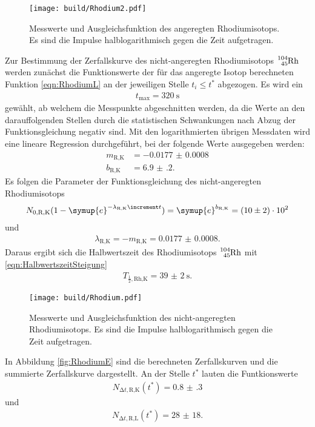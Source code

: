 \begin{figure}
  \centering
  \texttt{[image: build/Rhodium2.pdf]}
  \caption{Messwerte und Ausgleichsfunktion des angeregten Rhodiumisotops.
  Es sind die Impulse halblogarithmisch gegen die Zeit aufgetragen.}
  \label{fig:Rhodium2}
\end{figure}

\FloatBarrier

Zur Bestimmung der Zerfallskurve des nicht-angeregten Rhodiumisotops
$\ce{^{104}_{45}Rh}$ werden zunächst die Funktionswerte der für das angeregte
Isotop berechneten Funktion \eqref{eqn:RhodiumL} an der jeweiligen Stelle
$t_i \leq t^*$
abgezogen.
Es wird ein
\begin{align}
  t_\text{max} = \SI{320}{\second}
\end{align}
gewählt, ab welchem die Messpunkte abgeschnitten werden, da die Werte an den
darauffolgenden Stellen durch die statistischen Schwankungen nach Abzug
der Funktionsgleichung negativ sind.
Mit den logarithmierten übrigen Messdaten wird eine lineare Regression
durchgeführt, bei der folgende Werte ausgegeben werden:
\begin{align}
  m_\text{R,K} & = -\num{0.0177(8)} \\
  b_\text{R,K} & = \num{6.9(2)}.
\end{align}
Es folgen die Parameter der Funktionsgleichung des nicht-angeregten
Rhodiumisotops
\begin{align}
  N_\text{0,R,K}(1-\symup{e}^{-\lambda_\text{R,K}\increment t}) =
  \symup{e}^{b_\text{R,K}} = \num{10(2)e2}
\end{align}
und
\begin{align}
  \lambda_\text{R,K} = -m_\text{R,K} = \num{0.0177(8)}.
\end{align}
Daraus ergibt sich die Halbwertszeit des Rhodiumisotops $\ce{^{104}_{45}Rh}$
mit \eqref{eqn:HalbwertszeitSteigung}
\begin{align}
  T_{\frac{1}{2},\text{Rh,K}} = \SI{39(2)}{\second}.
\end{align}

\begin{figure}
  \centering
  \texttt{[image: build/Rhodium.pdf]}
  \caption{Messwerte und Ausgleichsfunktion des nicht-angeregten Rhodiumisotops.
  Es sind die Impulse halblogarithmisch gegen die Zeit aufgetragen.}
  \label{fig:Rhodium}
\end{figure}

\FloatBarrier

In Abbildung \ref{fig:RhodiumE} sind die berechneten Zerfallskurven und die
summierte Zerfallskurve dargestellt.
An der Stelle $t^*$ lauten die
Funtkionswerte
\begin{align}
  N_{\increment t,\text{R,K}} (t^*) = \num{0.8(3)}
\end{align}
und
\begin{align}
  N_{\increment t,\text{R,L}} (t^*) = \num{28(18)}.
\end{align}

